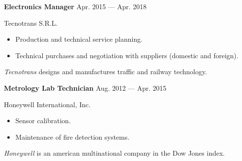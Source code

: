 \bigskip
\parbox[t][][t]{\linewidth}{
	{\parbox{\linewidth}{
		\parbox{\linewidth}{
			\textbf{Electronics Manager}
			\hfill
			{Apr. 2015 --- Apr. 2018}
		}
	}}
	\smallbreak
	\parbox{\linewidth}{Tecnotrans S.R.L.}
	\smallbreak
	\begin{itemize}
	    \item{Production and technical service planning.}
	    \item{Technical purchases and negotiation with suppliers (domestic and foreign).}
	\end{itemize}
	\smallbreak
	\emph{Tecnotrans} designs and manufactures traffic and railway technology.
}

\bigskip
\parbox[t][][t]{\linewidth}{
	{\parbox{\linewidth}{
		\parbox{\linewidth}{
			\textbf{Metrology Lab Technician}
			\hfill
			{Aug. 2012 --- Apr. 2015}
		}
	}}
	\smallbreak
	\parbox{\linewidth}{Honeywell International, Inc.}
	\smallbreak
	\begin{itemize}
	    \item{Sensor calibration.}
	    \item{Maintenance of fire detection systems.}
	\end{itemize}
	\smallbreak
    \emph{Honeywell} is an american multinational company in the Dow Jones index.
}
